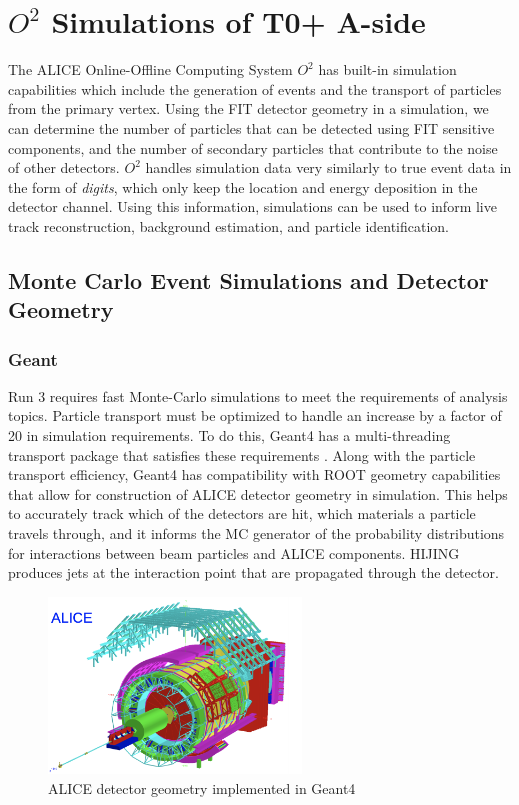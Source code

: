 
\chapter{$O^2$ Simulations of T0+ A-side}
The ALICE Online-Offline Computing System $O^2$ has built-in simulation capabilities which include the generation of events and the transport of particles from the primary vertex. Using the FIT detector geometry in a simulation, we can determine the number of particles that can be detected using FIT sensitive components, and the number of secondary particles that contribute to the noise of other detectors. $O^2$ handles simulation data very similarly to true event data in the form of \textit{digits}, which only keep the location and energy deposition in the detector channel. Using this information, simulations can be used to inform live track reconstruction, background estimation, and particle identification. 


\section{Monte Carlo Event Simulations and Detector Geometry}

\subsection{Geant}
Run 3 requires fast Monte-Carlo simulations to meet the requirements of analysis topics. Particle transport must be optimized to handle an increase by a factor of 20 in simulation requirements. To do this, Geant4 has a multi-threading transport package that satisfies these requirements \cite{Geant4}. Along with the particle transport efficiency, Geant4 has compatibility with ROOT geometry capabilities that allow for construction of ALICE detector geometry in simulation. This helps to accurately track which of the detectors are hit, which materials a particle travels through, and it informs the MC generator of the probability distributions for interactions between beam particles and ALICE components. HIJING produces jets at the interaction point that are propagated through the detector. 

\begin{figure}[H]
    \centering
    \includegraphics[width=0.6\textwidth]{figures/ALICE/GEANT_Geometry.png}
    \caption{ALICE detector geometry implemented in Geant4}
    \label{fig:GEANT_Geometry}
\end{figure}



